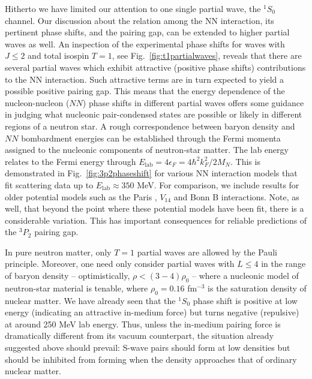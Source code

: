 \documentclass[preprint,rmp,aps,floatfix]{revtex4}
\begin{document}
Hitherto we have limited our attention to one single partial wave,
the $^1S_0$ channel. 
Our discussion about the relation among the NN interaction, its
pertinent phase shifts, and
the pairing gap, can be extended to higher partial waves as well. 
An inspection
of the experimental phase shifts for waves with $J \leq 2$ and total 
isospin $T=1$, see
Fig.~\ref{fig:t1partialwaves},
reveals that there are several partial waves which exhibit
attractive (positive phase shifts) contributions
to the NN interaction. Such attractive terms are in turn expected to
yield a possible positive pairing gap. This means that
the energy dependence of the nucleon-nucleon ($NN$) phase shifts in different 
partial waves offers some guidance in judging what nucleonic pair-condensed 
states are possible or likely in different regions of a neutron star.
A rough correspondence between baryon density and $NN$ bombardment energies
can be established through the Fermi momenta assigned to the nucleonic
components of neutron-star matter.
The lab energy relates to the Fermi energy through 
$E_{\mathrm{lab}}=4\epsilon_F=4\hbar^2k_F^2/2M_N$. 
This is demonstrated in Fig.~\ref{fig:3p2phaseshift} for various NN interaction
models that fit scattering data up to $E_{\mathrm{lab}}\approx 350$ MeV.
For comparison, we include results for older 
potential models such as the Paris 
\cite{paris}, $V_{14}$ \cite{v14} and Bonn B \cite{mach89} 
interactions. Note, as well, that 
beyond the point where these potential models 
have been fit, there is a considerable variation. This has important 
consequences for reliable predictions of the $^3P_2$ pairing gap.

In pure neutron matter, only $T=1$ partial waves are allowed by the
Pauli principle.  Moreover, one need only consider partial 
waves with $L\leq 4$ in the range of baryon density -- optimistically,
$\rho < (3-4) \rho_0$ -- where a nucleonic model of neutron-star material 
is tenable, where $\rho_0=0.16$ fm$^{-3}$ is
the saturation density of nuclear matter.  
We have already seen that the $^1S_0$ phase shift is positive at low energy 
(indicating an attractive in-medium force) but turns negative (repulsive) 
at around 250 MeV lab energy.  Thus, unless the in-medium pairing force 
is dramatically different from its vacuum counterpart, the situation 
already suggested above should prevail:  S-wave pairs should form at 
low densities but should be inhibited from forming when the density 
approaches that of ordinary nuclear matter.  
\end{document}
